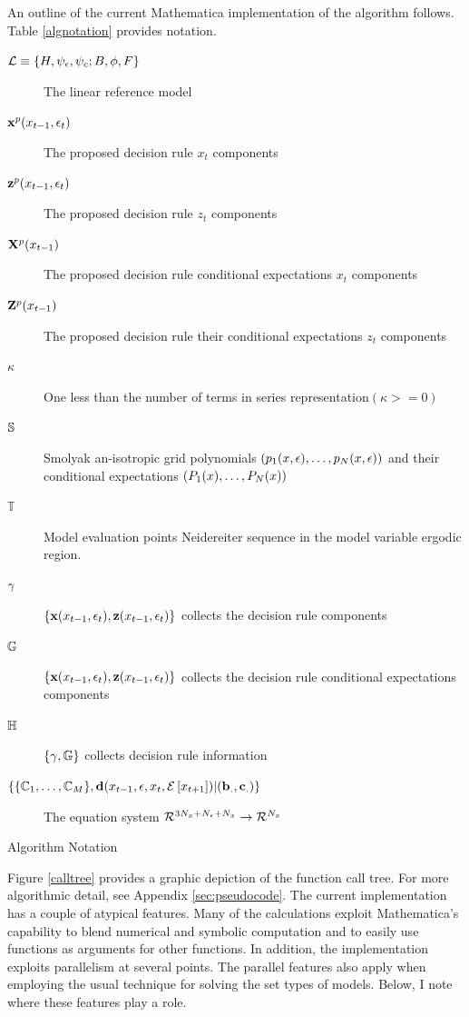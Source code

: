 \documentclass[12pt]{article}
\begin{document}
An outline of the current Mathematica implementation of the algorithm follows.
Table \ref{algnotation} provides notation.
\begin{table}[h]
  \centering
\begin{description}
\item[${\mathcal{L}}\equiv {\{H,\psi_\epsilon,\psi_c;B,\phi,F\}}$] The linear reference model
\item[$ \mathbf{x}^{p}(x_{t-1},\epsilon_t)$] The proposed decision rule  $x_t$ components
\item[$ \mathbf{z}^{p}(x_{t-1},\epsilon_t)$]The proposed decision rule  $z_t$ components
\item[$ \mathbf{X}^p(x_{t-1})$] The proposed decision rule conditional expectations  $x_t$ components
\item[$ \mathbf{Z}^p(x_{t-1})$] The proposed decision rule their conditional expectations  $z_t$ components
\item[$ \kappa$] One less than the number of terms in series representation$(\kappa>=0)$
\item[$\mathbb{S}$] Smolyak an-isotropic grid polynomials $(p_{1}(x,\epsilon),\ldots,p_{N}(x,\epsilon))$ and their conditional expectations $(P_{1}(x),\ldots,P_{N}(x))$
\item[$\mathbb{T}$] Model evaluation points Neidereiter sequence in the model variable ergodic region.
\item[$ {{\gamma}}$]  $\{\mathbf{x}(x_{t-1},\epsilon_t),\mathbf{z}(x_{t-1},\epsilon_t)\}$ collects the decision rule components
\item[$ {\mathbb{G}}$]  $\{\mathbf{x}(x_{t-1},\epsilon_t),\mathbf{z}(x_{t-1},\epsilon_t)\}$ collects the decision rule conditional expectations components
\item[$\mathbb{H}$] $\{{{\gamma}},{\mathbb{G}}\}$ collects decision rule information
\item[$\{\{\mathbb{C}_{1},\ldots,\mathbb{C}_{M}\},\mathbf{d}(x_{t-1},\epsilon,x_t,{\mathcal{E}\left [ x_{t+1} \right ]})|(\mathbf{b}_.,\mathbf{c}_.)\}$] The equation system ${{\mathcal{R}^{3{N_x}+{N_\epsilon}+{N_x}}}\rightarrow{\mathcal{R}^{{N_x}}}}$
\end{description}

  \caption{Algorithm Notation}\label{algnotation}
\end{table}
Figure \ref{calltree}
provides a graphic depiction of the function call tree. For more algorithmic detail, see Appendix \ref{sec:pseudocode}. 
The current implementation  has a couple of atypical features.  
Many of the calculations exploit Mathematica's capability to blend
numerical and symbolic computation and to easily use functions as arguments for
other functions.  In addition, the implementation exploits parallelism at
several points.   The parallel features also apply when employing
the  usual technique for solving the set types of models.
Below, I note where these features play a role.
\end{document}

